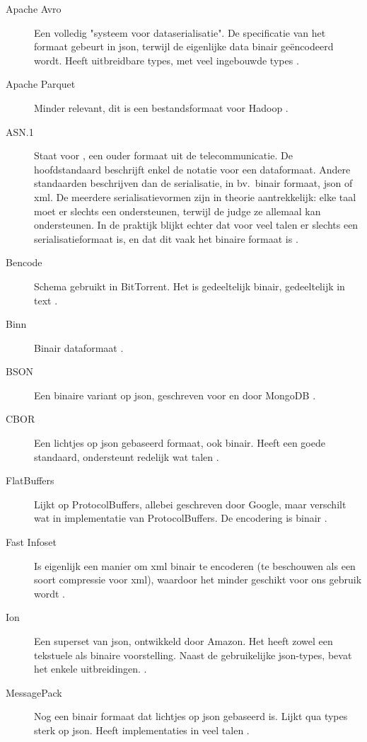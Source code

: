 \begin{description}
    \item[Apache Avro] Een volledig "systeem voor dataserialisatie".
    De specificatie van het formaat gebeurt in json, terwijl de eigenlijke data binair geëncodeerd wordt.
    Heeft uitbreidbare types, met veel ingebouwde types \autocite{avro}.
    \item[Apache Parquet] Minder relevant, dit is een bestandsformaat voor Hadoop \autocite{parquet}.
    \item[ASN.1] Staat voor , een ouder formaat uit de telecommunicatie.
    De hoofdstandaard beschrijft enkel de notatie voor een dataformaat.
    Andere standaarden beschrijven dan de serialisatie, in bv.\ binair formaat, json of xml.
    De meerdere serialisatievormen zijn in theorie aantrekkelijk: elke taal moet er slechts een ondersteunen, terwijl de judge ze allemaal kan ondersteunen.
    In de praktijk blijkt echter dat voor veel talen er slechts een serialisatieformaat is, en dat dit vaak het binaire formaat is \autocite{x680}.
    \item[Bencode] Schema gebruikt in BitTorrent.
    Het is gedeeltelijk binair, gedeeltelijk in text \autocite{cohen2017}.
    \item[Binn] Binair dataformaat \autocite{ramos2019}.
    \item[BSON] Een binaire variant op json, geschreven voor en door MongoDB \autocite{bson}.
    \item[CBOR] Een lichtjes op json gebaseerd formaat, ook binair.
    Heeft een goede standaard, ondersteunt redelijk wat talen \autocite{rfc7049}.
    \item[FlatBuffers] Lijkt op ProtocolBuffers, allebei geschreven door Google, maar verschilt wat in implementatie van ProtocolBuffers.
    De encodering is binair \autocite{flatbuffers}.
    \item[Fast Infoset] Is eigenlijk een manier om xml binair te encoderen (te beschouwen als een soort compressie voor xml), waardoor het minder geschikt voor ons gebruik wordt \autocite{x981}.
    \item[Ion] Een superset van json, ontwikkeld door Amazon.
    Het heeft zowel een tekstuele als binaire voorstelling.
    Naast de gebruikelijke json-types, bevat het enkele uitbreidingen. \autocite{ion}.
    \item[MessagePack] Nog een binair formaat dat lichtjes op json gebaseerd is.
    Lijkt qua types sterk op json.
    Heeft implementaties in veel talen \autocite{messagepack}.

\end{description}
